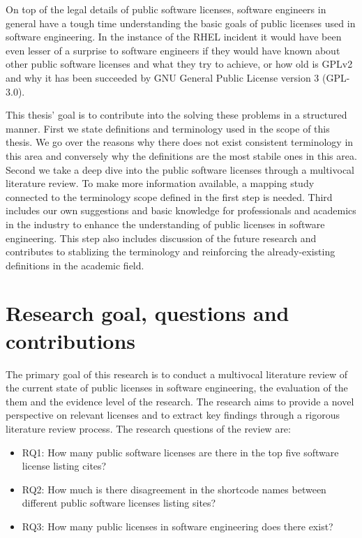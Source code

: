On top of the legal details of public software licenses, software engineers in general have a tough time understanding the basic goals of public licenses used in software engineering. In the instance of the RHEL incident it would have been even lesser of a  surprise to software engineers if they would have known about other public software licenses and what they try to achieve, or how old is GPLv2 and why it has been succeeded by GNU General Public License version 3 (GPL-3.0).

This thesis' goal is to contribute into the solving these problems in a structured manner. First we state definitions and terminology used in the scope of this thesis. We go over the reasons why there does not exist consistent terminology in this area and conversely why the definitions are the most stabile ones in this area. Second we take a deep dive into the public software licenses through a multivocal literature review. To make more information available, a mapping study connected to the terminology scope defined in the first step is needed. Third includes our own suggestions and basic knowledge for professionals and academics in the industry to enhance the understanding of public licenses in software engineering. This step also includes discussion of the future research and contributes to stablizing the terminology and reinforcing the already-existing definitions in the academic field.

\section{Research goal, questions and contributions}
The primary goal of this research is to conduct a multivocal literature review of the current state of public licenses in software engineering, the evaluation of the them and the evidence level of the research. The research aims to provide a novel perspective on relevant licenses and to extract key findings through a rigorous literature review process. The research questions of the review are:
\begin{itemize}
	\item RQ1: How many public software licenses are there in the top five software license listing cites?
	\item RQ2: How much is there disagreement in the shortcode names between different public software licenses listing sites?
	\item RQ3: How many public licenses in software engineering does there exist?
\end{itemize}

